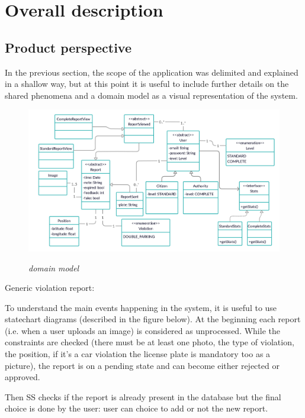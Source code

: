 \documentclass[../RASD.tex]{subfiles}
\begin{document}
    \chapter{Overall description}\label{ch:overall-description}
    \section{Product perspective}\label{sec:product-perspective}
    In the previous section, the scope of the application was delimited and explained in a shallow way, but at this point it is useful to include further details on the shared phenomena and a domain model as a visual representation of the system.

    \begin{figure}[H]
        \centering
        \includegraphics[scale = 1.1]{assets/domainModel.png}\\[1.6 cm]
        \caption[ \textit{Domain model}]{ \textit{domain model}}
    \end{figure}
    Generic violation report:

    To understand the main events happening in the system, it is useful to use statechart diagrams (described in the figure below). At the beginning each report (i.e. when a user uploads an image) is considered as unprocessed. While the constraints are checked (there must be at least one photo, the type of violation, the position, if it’s a car violation the license plate is mandatory too as a picture), the report is on a pending state and can become either rejected or approved.

    Then SS checks if the report is already present in the database but the final choice is done by the user: user can choice to add or not the new report.
\end{document}
